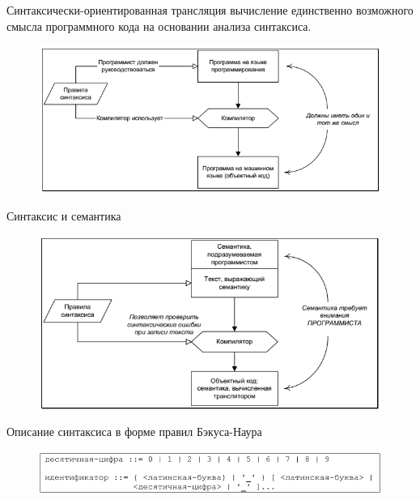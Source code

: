 \documentclass{beamer}
\begin{document}
\begin{frame}
\begin{block}{Синтаксически-ориентированная трансляция}
вычисление единственно возможного смысла программного кода на
основании анализа синтаксиса.
\begin{figure}[h]
\centering
\includegraphics[scale=0.6]{images/lec01-pic12.png}
\end{figure}
\end{block}
\end{frame}

\begin{frame}
\begin{block}{Синтаксис и семантика}
\begin{figure}[h]
\centering
\includegraphics[scale=0.6]{images/lec01-pic13.png}
\end{figure}
\end{block}
\end{frame}

\begin{frame}
\begin{block}{Описание синтаксиса в форме правил Бэкуса-Наура}
\begin{figure}[h]
\centering
\includegraphics[scale=0.5]{images/lec01-pic14.png}
\end{figure}
\end{block}
\end{frame}
\end{document}
